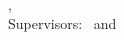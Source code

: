 \hfill
\vfill
{
	\small
	\textbf{\thesisName} \\
	\thesisSubject, \thesisDate \\
	Supervisors: \thesisFirstSupervisor\ and \thesisSecondSupervisor \\[1.5em]
	\textbf{\thesisUniversity} \\
	\textit{\thesisUniversityGroup} \\
	\thesisUniversityInstitute \\
	\thesisUniversityDepartment \\
	\thesisUniversityStreetAddress \\
	\thesisUniversityPostalCode \hspace{1mm} \thesisUniversityCity
}

